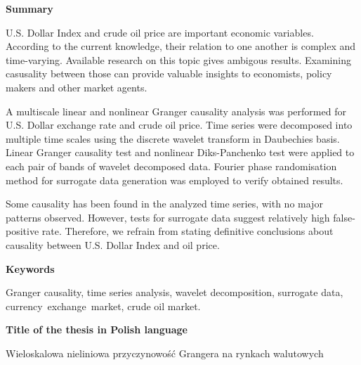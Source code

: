 \newpage
\begin{center}
\textbf{Summary}
\end{center}

U.S. Dollar Index and crude oil price are important economic variables.
According to the current knowledge, their relation to one another is complex and time-varying.
Available research on this topic gives ambigous results.
Examining casusality between those can provide valuable insights to economists, policy makers and other market agents.

A multiscale linear and nonlinear Granger causality analysis was performed for U.S. Dollar exchange rate and crude oil price.
Time series were decomposed into multiple time scales using the discrete wavelet transform in Daubechies basis.
Linear Granger causality test and nonlinear Diks-Panchenko test were applied to each pair of bands of wavelet decomposed data.
Fourier phase randomisation method for surrogate data generation was employed to verify obtained results.

Some causality has been found in the analyzed time series, with no major patterns observed.
However, tests for surrogate data suggest relatively high false-positive rate.
Therefore, we refrain from stating definitive conclusions about causality between U.S. Dollar Index and oil price.
\vspace{2.5cm}
\begin{center}

\textbf{Keywords}\vspace{0.3cm}

Granger causality, time series analysis, wavelet decomposition, surrogate data, \mbox{currency exchange market}, crude oil market.\\
\vspace{2.5cm}

\textbf{Title of the thesis in Polish language}\vspace{0.3cm}

Wieloskalowa nieliniowa przyczynowość Grangera na rynkach walutowych
\end{center}

